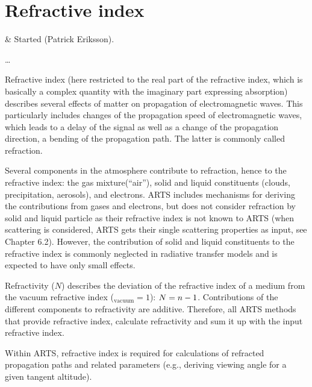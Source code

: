 \chapter{Refractive index}
 \label{sec:rindex}

 & Started (Patrick Eriksson).\\
\stophistory

 \dots

Refractive index (here restricted to the real part of the refractive index, which is basically a complex quantity with the imaginary part expressing absorption) describes several effects of matter on propagation of electromagnetic waves. This particularly includes changes of the propagation speed of electromagnetic waves, which leads to a delay of the signal as well as a change of the propagation direction, a bending of the propagation path. The latter is commonly called refraction.

Several components in the atmosphere contribute to refraction, hence to the refractive index: the gas mixture(``air''), solid and liquid constituents (clouds, precipitation, aerosols), and electrons. ARTS includes mechanisms for deriving the contributions from gases and electrons, but does not consider refraction by solid and liquid particle as their refractive index is not known to ARTS (when scattering is considered, ARTS gets their single scattering properties as input, see Chapter 6.2). However, the contribution of solid and liquid constituents to the refractive index is commonly neglected in radiative transfer models and is expected to have only small effects.

Refractivity ($N$) describes the deviation of the refractive index of a medium \Rfr  from the vacuum refractive index (\Rfr$_\mathrm{vacuum}=1$): $N=n-1$. Contributions of the different components to refractivity are additive. Therefore, all ARTS methods that provide refractive index, calculate refractivity and sum it up with the input refractive index.

Within ARTS, refractive index is required for calculations of refracted propagation paths and related parameters (e.g., deriving viewing angle for a given tangent altitude). 




